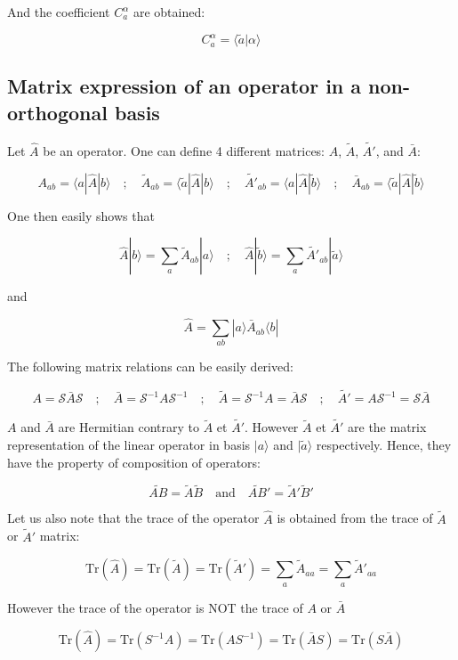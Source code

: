 \documentclass{article}
\newcommand{\bra}[1]{\langle #1|}
\newcommand{\ket}[1]{|#1\rangle}
\newcommand{\braket}[2]{\langle #1|#2\rangle}
\newcommand{\op}[1]{\hat{#1}}
\begin{document}
\noindent
And the coefficient $C_a^{\alpha}$ are obtained:

\[ C_a^{\alpha}= \braket{ \tilde{a}}{\alpha}\]


\subsection{Matrix expression of an operator in a non-orthogonal basis}

Let $\op{A}$ be an operator.
One can define 4 different matrices: $A$, $\tilde{A}$, $\tilde{A'}$, and $\bar{A}$:

\[  A_{ab}=\bra{a } \op{A} \ket{b} \quad ; \quad 
   \tilde{A}_{ab}=\bra{\tilde{a}} \op{A} \ket{b} \quad ; \quad
   \tilde{A'}_{ab}=\bra{a} \op{A} \ket{\tilde{b}} \quad ; \quad   
   \bar{A}_{ab}=\bra{\tilde{a}} \op{A} \ket{\tilde{b}} \]

One then easily shows that

\[ \op{A}\ket{b}=\sum_a \tilde{A}_{ab} \ket{a} \quad ; \quad 
   \op{A}\ket{\tilde{b}}=\sum_a \tilde{A'}_{ab} \ket{\tilde{a}}\]

and

\[ \op{A}=\sum_{ab} \ket{a}\bar{A}_{ab} \bra{b} \]


\noindent
The following matrix relations can be easily derived:

\[   A=\mathcal{S}\bar{A}\mathcal{S} \quad ; \quad 
    \bar{A}=\mathcal{S}^{-1}A\mathcal{S}^{-1} \quad ; \quad 
    \tilde{A}=\mathcal{S}^{-1}A=\bar{A}\mathcal{S} \quad ; \quad 
    \tilde{A'}=A\mathcal{S}^{-1}=\mathcal{S}\bar{A} \]

 
 \noindent
$A$ and $\bar{A}$ are Hermitian contrary to $\tilde{A}$ et $\tilde{A'}$. However  $\tilde{A}$ et $\tilde{A'}$ are the matrix representation of the linear operator in basis $\ket{a}$ and $\ket{\tilde{a}}$ respectively. Hence, they have the property of composition of operators:

\[ \widetilde{AB}=\tilde{A}\tilde{B} \quad \text{and} \quad  \widetilde{AB}'=\tilde{A}'\tilde{B}'\]

 \noindent
Let us also note that the trace of the operator $\op{A}$ is obtained from the trace of $\tilde{A}$ or $\tilde{A}'$ matrix:

\[\text{Tr}(\op{A})=\text{Tr}(\tilde{A})=\text{Tr}(\tilde{A}')=\sum_a \tilde{A}_{aa}=\sum_a \tilde{A}'_{aa}\]

 \noindent
However the trace of the operator is NOT the trace of $A$ or $\bar{A}$

\[\text{Tr}(\op{A})=\text{Tr}(S^{-1}A)=\text{Tr}(AS^{-1})=\text{Tr}(\bar{A}S)=\text{Tr}(S\bar{A})\]
\end{document}
